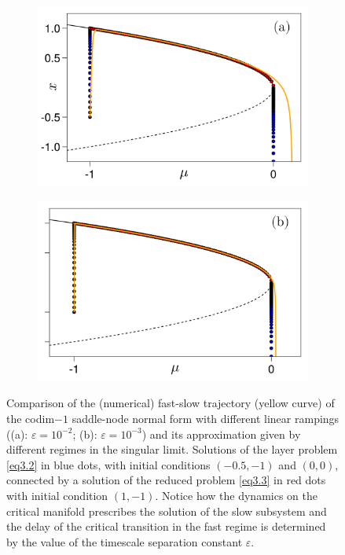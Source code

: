 \documentclass[../main.tex]{subfiles}
\begin{document}
\begin{figure}[H]
       \centering 
       \begin{subfigure}[b]{0.475\textwidth}
        \centering 
        \includegraphics[keepaspectratio, width = \textwidth]{../figures/fig3.1.1.png}
        \label{fig3.1.1}
       \end{subfigure}
       \hfill 
       \begin{subfigure}[b]{0.475\textwidth}
        \centering 
        \includegraphics[keepaspectratio, width = \textwidth]{../figures/fig3.1.2.png}
        \label{fig3.1.2}
       \end{subfigure}
       \caption{Comparison of the (numerical) fast-slow trajectory (yellow curve) of the codim$-1$ saddle-node normal form  with different linear rampings ((a): $\varepsilon=10^{-2}$; (b): $\varepsilon=10^{-3}$) and its approximation given by different regimes in the singular limit.
       Solutions of the layer problem \eqref{eq3.2} in blue dots, with initial conditions $(-0.5,-1)$ and $(0,0)$, connected by a solution of the reduced problem \eqref{eq3.3} in red dots with initial condition $(1,-1)$. 
Notice how the dynamics on the critical manifold prescribes the solution of the slow subsystem and the delay of the critical transition in the fast regime is determined by the value of the timescale separation constant $\varepsilon$.}
       \label{fig3.1}
\end{figure}
\end{document}
